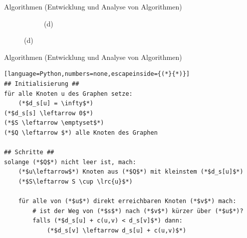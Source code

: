 \begin{frame}[fragile]{Algorithmen (Entwicklung und Analyse von Algorithmen)}
\begin{figure}[H]
\begin{subfigure}[b]{0.46\textwidth}
{
			}%
			\caption*{(d)}
		\end{subfigure}
	\end{figure}
\end{frame}

\begin{frame}[fragile]{Algorithmen (Entwicklung und Analyse von Algorithmen)}
	\lstset{basicstyle=\ttfamily\footnotesize}
	\begin{lstlisting}[language=Python,numbers=none,escapeinside={(*}{*)}]
## Initialisierung ##
für alle Knoten u des Graphen setze:
    (*$d_s[u] = \infty$*)
(*$d_s[s] \leftarrow 0$*)
(*$S \leftarrow \emptyset$*)
(*$Q \leftarrow $*) alle Knoten des Graphen

## Schritte ##
solange (*$Q$*) nicht leer ist, mach:
    (*$u\leftarrow$*) Knoten aus (*$Q$*) mit kleinstem (*$d_s[u]$*)
    (*$S\leftarrow S \cup \lrc{u}$*)

    für alle von (*$u$*) direkt erreichbaren Knoten (*$v$*) mach:
        # ist der Weg von (*$s$*) nach (*$v$*) kürzer über (*$u$*)?
        falls (*$d_s[u] + c(u,v) < d_s[v]$*) dann:
            (*$d_s[v] \leftarrow d_s[u] + c(u,v)$*)
\end{lstlisting}
	\lstset{style=BaselineStyle}
\end{frame}


